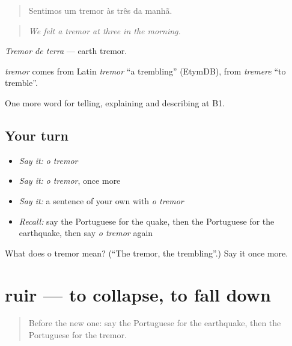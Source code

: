 \begin{quote}
Sentimos um tremor às três da manhã.
\end{quote}

\begin{quote}
\emph{We felt a tremor at three in the morning.}
\end{quote}

\emph{Tremor de terra} — earth tremor.

\begin{cousinweb}
\emph{tremor} comes from Latin \emph{tremor} \textquotedblleft{}a trembling\textquotedblright{} (EtymDB), from \emph{tremere} \textquotedblleft{}to tremble\textquotedblright{}.
\end{cousinweb}

\begin{grammarlens}[title={What you've built}]
One more word for telling, explaining and describing at B1.
\end{grammarlens}

\subsection*{Your turn}
\begin{itemize}
\raggedright
  \item \emph{Say it:} \emph{o tremor}
  \item \emph{Say it:} \emph{o tremor}, once more
  \item \emph{Say it:} a sentence of your own with \emph{o tremor}
  \item \emph{Recall:} say the Portuguese for the quake, then the Portuguese for the earthquake, then say \emph{o tremor} again
\end{itemize}

\begin{tcolorbox}[breakable,colback=teal!4,colframe=teal!35!black,title={Before you move on}]
What does o tremor mean? (\textquotedblleft{}The tremor, the trembling\textquotedblright{}.) Say it once more.
\end{tcolorbox}
\section[ruir]{ruir — to collapse, to fall down}

\label{lesson:PT-C302-ruir}



\begin{quote}
Before the new one: say the Portuguese for the earthquake, then the Portuguese for the tremor.
\end{quote}

